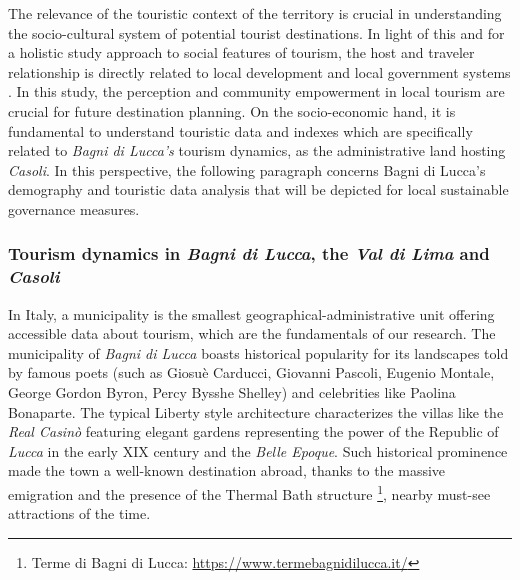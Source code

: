 \documentclass[sustainability,article,submit,pdftex,moreauthors]{Definitions/mdpi}
\begin{document}

The relevance of the touristic context of the territory is crucial in understanding the socio-cultural system of potential tourist destinations. In light of this and for a holistic study approach to social features of tourism, the host and traveler relationship is directly related to local development and local government systems \cite{amo21}. In this study, the perception and community empowerment in local tourism are crucial for future destination planning.
On the socio-economic hand, it is fundamental to understand touristic data and indexes which are specifically related to \textit{Bagni di Lucca's} tourism dynamics, as the administrative land hosting \textit{Casoli}. 
In this perspective, the following paragraph concerns {Bagni di Lucca's} demography and touristic data analysis that will be depicted for local sustainable governance measures.



\subsubsection{Tourism dynamics in \emph{Bagni di Lucca}, the \emph{Val di Lima} and \emph{Casoli}}

In Italy, a municipality is the smallest geographical-administrative unit offering accessible data about tourism, which are the fundamentals of our research. The municipality of \emph{Bagni di Lucca} boasts historical popularity for its landscapes told by famous poets (such as Giosuè Carducci, Giovanni Pascoli, Eugenio Montale, George Gordon Byron, Percy Bysshe Shelley) and celebrities like Paolina Bonaparte. The typical Liberty style architecture characterizes the villas like the \textit{Real Casinò} featuring elegant gardens representing the power of the Republic of \emph{Lucca} in the early XIX century and the \emph{Belle Epoque}. Such historical prominence made the town a well-known destination abroad, thanks to the massive emigration and the presence of the Thermal Bath structure \footnote{Terme di Bagni di Lucca: \url{https://www.termebagnidilucca.it/}}, nearby must-see attractions of the time.
\end{document}
